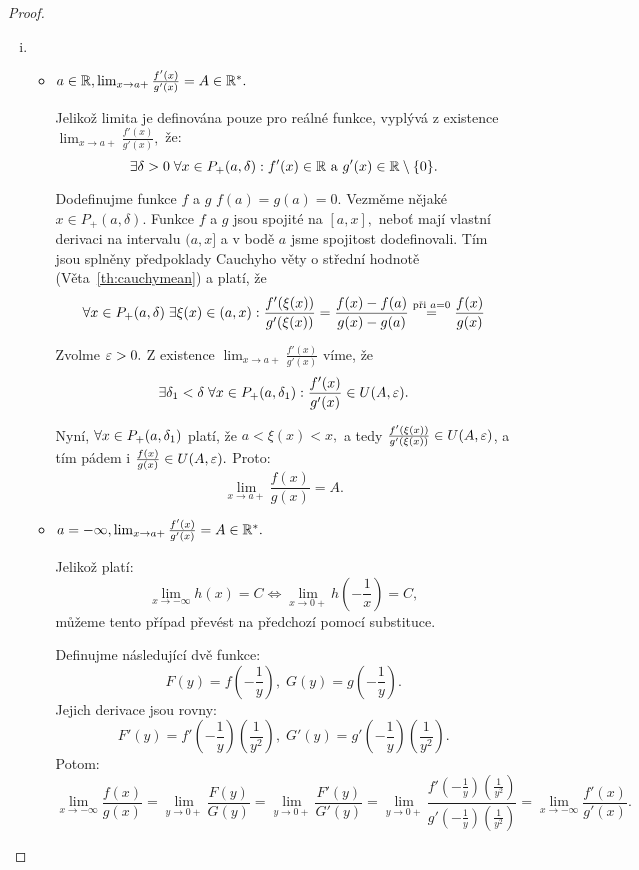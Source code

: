 \begin{proof}
    \leavevmode
    \begin{enumerate}[(i)]
        \item 
            \begin{itemize}
                \item $a \in \mathbb{R}, \lim_{x \to a+} \frac{f'(x)}{g'(x)} = A \in \mathbb{R}^*.$

                    Jelikož limita je definována pouze pro reálné funkce, 
                    vyplývá z existence $\lim_{x \to a+} \frac{f'(x)}{g'(x)},$
                    že:
                    $$\exists \delta > 0 \; \forall x \in P_+(a, \delta): f'(x) \in \mathbb{R}
                    \text{ a } g'(x) \in \mathbb{R} \setminus \{0\}.$$

                    Dodefinujme funkce $f$ a $g$ \tz $f(a) = g(a) = 0.$ Vezměme
                    nějaké $x \in P_+(a, \delta).$ Funkce $f$ a $g$ jsou
                    spojité na $[a,x], $ neboť mají vlastní derivaci na 
                    intervalu $(a,x]$ a v bodě $a$ jsme spojitost dodefinovali.
                    Tím jsou splněny předpoklady Cauchyho věty o střední
                    hodnotě (Věta~\ref{th:cauchymean}) a platí, že 
                    $$\forall x \in P_+(a, \delta) \; \exists \xi(x) \in (a,x):
                    \frac{f'(\xi(x))}{g'(\xi(x))} = \frac{f(x) - f(a)}{g(x) - g(a)}
                    \stackrel{\text{při }a=0}{=} \frac{f(x)}{g(x)}$$

                    Zvolme $\varepsilon > 0.$ Z existence
                    $\lim_{x \to a+} \frac{f'(x)}{g'(x)}$ víme, že 
                    $$\exists \delta_1 < \delta \; \forall x \in P_+(a, \delta_1):
                    \frac{f'(x)}{g'(x)} \in U(A, \varepsilon).$$

                    Nyní, $\forall x \in P_+(a, \delta_1)$ platí, že $a < \xi(x) < x,$
                    a tedy $\frac{f'(\xi(x))}{g'(\xi(x))} \in U(A, \varepsilon)$, a tím
                    pádem i $\frac{f(x)}{g(x)} \in U(A, \varepsilon).$ Proto:
                    $$\lim_{x \to a+} \frac{f(x)}{g(x)} = A.$$

                \item $a = - \infty, \lim_{x \to a+} \frac{f'(x)}{g'(x)} = A \in \mathbb{R}^*.$

                    Jelikož platí:
                    $$\lim_{x \to -\infty} h(x) = C \iff \lim_{x \to 0+} h(-\frac{1}{x}) = C,$$
                    můžeme tento případ převést na předchozí pomocí substituce.

                    Definujme následující dvě funkce:
                    $$F(y) = f(-\frac{1}{y}), \; G(y) = g(-\frac{1}{y}).$$
                    Jejich derivace jsou rovny:
                    $$F'(y) = f'(-\frac{1}{y})(\frac{1}{y^2}), 
                    \; G'(y) = g'(-\frac{1}{y})(\frac{1}{y^2}).$$
                    Potom:
                    $$\lim_{x \to -\infty}\frac{f(x)}{g(x)} = 
                    \lim_{y \to 0+} \frac{F(y)}{G(y)} =
                    \lim_{y \to 0+} \frac{F'(y)}{G'(y)} = 
                    \lim_{y \to 0+} \frac{f'(-\frac{1}{y})(\frac{1}{y^2})}{g'(-\frac{1}{y})(\frac{1}{y^2})} =
                    \lim_{x \to -\infty} \frac{f'(x)}{g'(x)}.$$
            \end{itemize}


\end{enumerate}
\end{proof}
